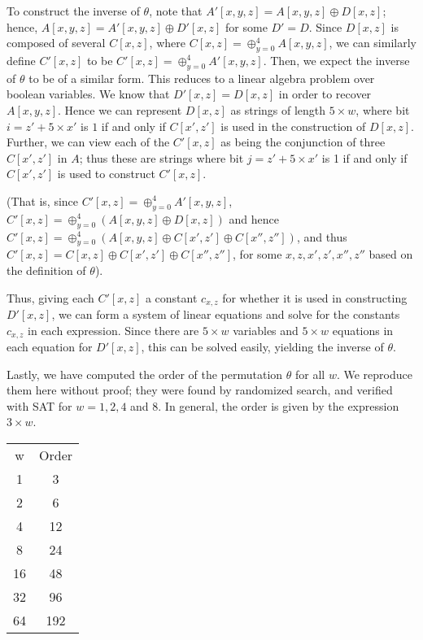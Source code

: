 \documentclass[10pt,twocolumn,twoside]{pnas-new}
\begin{document}
To construct the inverse of $\theta$, note that
$A'[x, y, z] = A[x, y, z] \oplus D[x, z]$; hence,
$A[x, y, z] = A'[x, y, z] \oplus D'[x, z]$ for some $D' = D$. Since $D[x, z]$
is composed of several $C[x, z]$, where
$C[x, z] = \oplus_{y = 0}^{4} A[x, y, z]$, we can similarly define $C'[x, z]$
to be $C'[x, z] = \oplus_{y = 0}^{4} A'[x, y, z]$. Then, we expect the inverse
of $\theta$ to be of a similar form. This reduces to a linear algebra problem
over boolean variables. We know that $D'[x, z] = D[x, z]$ in order to recover
$A[x, y, z]$. Hence we can represent $D[x, z]$ as strings of length
$5 \times w$, where bit $i = z' + 5 \times x'$ is $1$ if and only if
$C[x', z']$ is used in the construction of $D[x, z]$. Further, we can view each
of the $C'[x, z]$ as being the conjunction of three $C[x', z']$ in $A$; thus
these are strings where bit $j = z' + 5\times x'$ is 1 if and only if
$C[x', z']$ is used to construct $C'[x, z]$.

(That is, since $C'[x, z] = \oplus_{y = 0}^{4} A'[x, y, z]$,
$C'[x, z] = \oplus_{y = 0}^{4} (A[x, y, z] \oplus D[x, z])$ and hence
$C'[x, z] = \oplus_{y = 0}^{4} (A[x, y, z] \oplus C[x', z'] \oplus C[x'', z''])$,
and thus $C'[x, z] = C[x, z] \oplus C[x', z'] \oplus C[x'', z'']$, for some
$x, z, x', z', x'', z''$ based on the definition of $\theta$).

Thus, giving each $C'[x, z]$ a constant $c_{x,z}$ for whether it is used in
constructing $D'[x, z]$, we can form a system of linear equations and solve for
the constants $c_{x, z}$ in each expression. Since there are $5 \times w$
variables and $5 \times w$ equations in each equation for $D'[x, z]$, this can
be solved easily, yielding the inverse of $\theta$.


Lastly, we have computed the order of the permutation $\theta$ for all $w$.
We reproduce them here without proof; they were found by randomized search, and
verified with SAT for $w = 1, 2, 4$ and $8$. In general, the order is given by
the expression $3 \times w$.

\begin{tabular}{c c} \label{tab:p:t:1}
    w & Order \\
    1 & 3 \\
    2 & 6 \\
    4 & 12 \\
    8 & 24 \\
    16 & 48 \\
    32 & 96 \\
    64 & 192 \\
\end{tabular}
\end{document}
